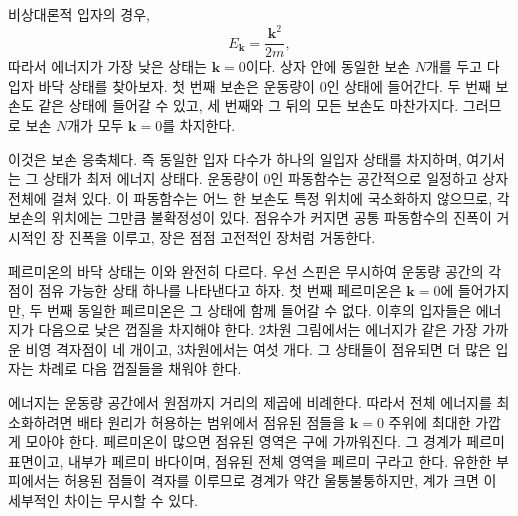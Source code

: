 비상대론적 입자의 경우,
\begin{equation}
E_{\mathbf{k}}=\frac{\mathbf{k}^2}{2m},
\end{equation}
따라서 에너지가 가장 낮은 상태는 \(\mathbf{k}=0\)이다. 상자 안에 동일한 보손 \(N\)개를 두고 다입자 바닥 상태를 찾아보자. 첫 번째 보손은 운동량이 0인 상태에 들어간다. 두 번째 보손도 같은 상태에 들어갈 수 있고, 세 번째와 그 뒤의 모든 보손도 마찬가지다. 그러므로 보손 \(N\)개가 모두 \(\mathbf{k}=0\)를 차지한다.

이것은 보손 응축체다. 즉 동일한 입자 다수가 하나의 일입자 상태를 차지하며, 여기서는 그 상태가 최저 에너지 상태다. 운동량이 0인 파동함수는 공간적으로 일정하고 상자 전체에 걸쳐 있다. 이 파동함수는 어느 한 보손도 특정 위치에 국소화하지 않으므로, 각 보손의 위치에는 그만큼 불확정성이 있다. 점유수가 커지면 공통 파동함수의 진폭이 거시적인 장 진폭을 이루고, 장은 점점 고전적인 장처럼 거동한다.

페르미온의 바닥 상태는 이와 완전히 다르다. 우선 스핀은 무시하여 운동량 공간의 각 점이 점유 가능한 상태 하나를 나타낸다고 하자. 첫 번째 페르미온은 \(\mathbf{k}=0\)에 들어가지만, 두 번째 동일한 페르미온은 그 상태에 함께 들어갈 수 없다. 이후의 입자들은 에너지가 다음으로 낮은 껍질을 차지해야 한다. 2차원 그림에서는 에너지가 같은 가장 가까운 비영 격자점이 네 개이고, 3차원에서는 여섯 개다. 그 상태들이 점유되면 더 많은 입자는 차례로 다음 껍질들을 채워야 한다.

에너지는 운동량 공간에서 원점까지 거리의 제곱에 비례한다. 따라서 전체 에너지를 최소화하려면 배타 원리가 허용하는 범위에서 점유된 점들을 \(\mathbf{k}=0\) 주위에 최대한 가깝게 모아야 한다. 페르미온이 많으면 점유된 영역은 구에 가까워진다. 그 경계가 페르미 표면이고, 내부가 페르미 바다이며, 점유된 전체 영역을 페르미 구라고 한다. 유한한 부피에서는 허용된 점들이 격자를 이루므로 경계가 약간 울퉁불퉁하지만, 계가 크면 이 세부적인 차이는 무시할 수 있다.

